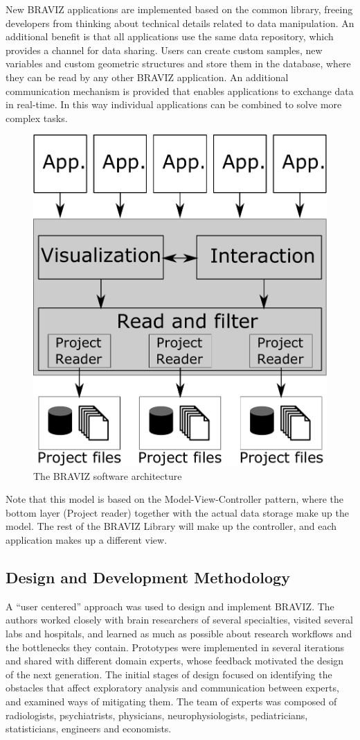 \documentclass[twocolumn]{svjour3}
\begin{document}
New BRAVIZ applications are implemented based on the common library, freeing developers from thinking about technical details related to data manipulation. An additional benefit is that all applications use the same data repository, which provides a channel for data sharing. Users can create custom samples, new variables and custom geometric structures and store them in the database, where they can be read by any other BRAVIZ application. An additional communication mechanism is provided that enables applications to exchange data in real-time. In this way individual applications can be combined to solve more complex tasks.

\begin{figure}
\begin{center}
\includegraphics[width=0.6\linewidth]{arquitecture.pdf}
\end{center}
 \caption{\label{fig_arch} The BRAVIZ software architecture}
\end{figure}

Note that this model is based on the Model-View-Controller pattern, where the bottom layer (Project reader) together with the actual data storage make up the model. The rest of the BRAVIZ Library will make up the controller, and each application makes up a different view.

\subsection{Design and Development Methodology}

A ``user centered'' approach \cite{wassink_applying_2009} was used to design and implement BRAVIZ. The authors worked closely with brain researchers of several specialties, visited several labs and hospitals, and learned as much as possible about research workflows and the bottlenecks they contain. Prototypes were implemented in several iterations and shared with different domain experts, whose feedback motivated the design of the next generation.
The initial stages of design focused on identifying the obstacles that affect exploratory analysis and communication between experts, and examined ways of mitigating them. The team of experts was composed of radiologists, psychiatrists, physicians, neurophysiologists, pediatricians, statisticians, engineers and economists.
\end{document}

